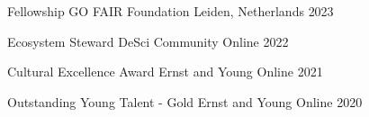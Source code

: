 
\begin{cvhonors}

  \cvhonor
    {Fellowship} %
    {GO FAIR Foundation} %
    {Leiden, Netherlands} %
    {2023} %

  \cvhonor
    {Ecosystem Steward} %
    {DeSci Community} %
    {Online} %
    {2022} %

  \cvhonor
    {Cultural Excellence Award} %
    {Ernst and Young} %
    {Online} %
    {2021} %

  \cvhonor
    {Outstanding Young Talent - Gold} %
    {Ernst and Young} %
    {Online} %
    {2020} %

\end{cvhonors}
